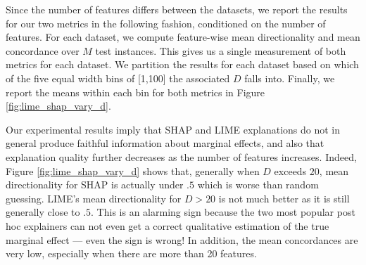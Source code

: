 \documentclass[mnsc,blindrev]{informs3}
\newcommand{\mG}{\mathcal{G}}
\newcommand{\mM}{\mathcal{M}}
\begin{document}
        Since the number of features differs between the datasets, we report the results for our two metrics in the following fashion, conditioned on the number of features. %
        For each dataset, we compute feature-wise mean directionality and mean concordance over $M$ test instances.%
        This gives us a single measurement of both metrics for each dataset. We partition the results for each dataset based on which of the five equal width bins of [1,100] the associated $D$ falls into. Finally, we report the means within each bin for both metrics in Figure \ref{fig:lime_shap_vary_d}.  %

    
    Our experimental results imply that SHAP and LIME explanations do not in general produce faithful information about marginal effects, and also that explanation quality further decreases as the number of features increases. Indeed, Figure \ref{fig:lime_shap_vary_d} shows that, generally when $D$ exceeds $20$, mean directionality for SHAP is actually under $.5$ which is worse than random guessing. LIME's mean directionality for $D> 20$ is not much better as it is still generally close to $.5$. This is an alarming sign because the two most popular post hoc explainers can not even get a correct qualitative estimation of the true marginal effect --- even the sign is wrong! In addition, the mean concordances are very low, especially when there are more than 20 features. %
\end{document}

